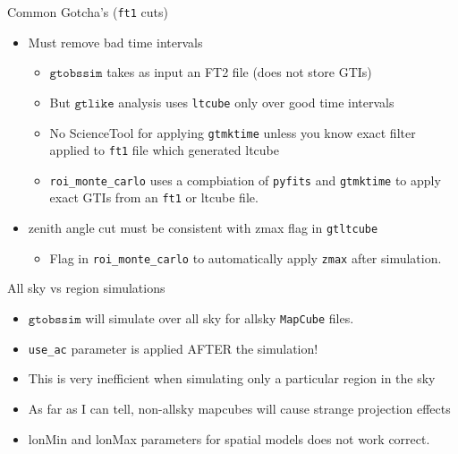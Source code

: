 \documentclass[12pt]{beamer}
\newcommand{\gtlike}{\ensuremath{\mathtt{gtlike}}\xspace}
\newcommand{\gtobssim}{\ensuremath{\mathtt{gtobssim}}\xspace}
\newcommand{\roimc}{\texttt{roi\_monte\_carlo}\xspace}
\newcommand{\mapcube}{\texttt{MapCube}\xspace}
\newcommand{\ftone}{\texttt{ft1}\xspace}
\begin{document}
\begin{frame}{Common Gotcha's (\ftone cuts)}
  \begin{itemize}
    \item Must remove bad time intervals
      \begin{itemize}
        \item \gtobssim takes as input an FT2 file (does not store GTIs)
        \item But \gtlike analysis uses \texttt{ltcube} only over good time intervals
        \item No ScienceTool for applying \texttt{gtmktime} unless you know exact filter applied to \ftone file
          which generated ltcube
        \item \roimc uses a compbiation of \texttt{pyfits} and \texttt{gtmktime} to apply exact GTIs
          from an \ftone or ltcube file.
      \end{itemize}
    \item zenith angle cut must be consistent with zmax flag in \texttt{gtltcube}
      \begin{itemize}
        \item Flag in \roimc to automatically apply \texttt{zmax} after simulation.
      \end{itemize}
  \end{itemize}
\end{frame}

\begin{frame}{All sky vs region simulations}
  \begin{itemize}
    \item \gtobssim will simulate over all sky for allsky \mapcube files.
    \item \texttt{use\_ac} parameter is applied AFTER the simulation!
    \item This is very inefficient when simulating only a particular region in the sky
    \item As far as I can tell, non-allsky mapcubes will cause strange projection effects
    \item lonMin and lonMax parameters for spatial models does not work correct.
  \end{itemize}
\end{frame}
\end{document}
